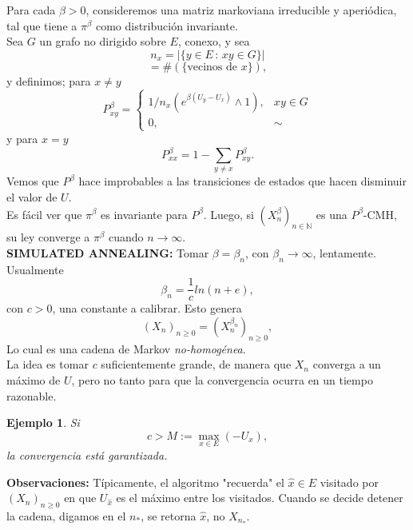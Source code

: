 \documentclass[a4paper]{article}
\newtheorem{ejemplo}{Ejemplo}
\numberwithin{equation}{subsection}
\numberwithin{definicion}{subsection}
\def\N{\mathbb N}
\begin{document}
Para cada $\beta >0$, consideremos una matriz markoviana irreducible y aperiódica, tal que tiene a $\pi^\beta$ como distribución invariante. \\ Sea $G$ un grafo no dirigido sobre $E$, conexo, y sea
\[n_x = |\{y \in E\,:\,xy \in G\}|\]
\[= \#\left(\{\text{vecinos de }x\}\right),\]
y definimos; para $x\neq y$
\[P_{xy}^\beta = \begin{cases}
1/n_x\left(e^{\beta(U_y-U_x)}\wedge 1\right), & xy\in G\\
0, & \sim
\end{cases}\]
y para $x=y$
\[P_{xx}^\beta = 1-\sum_{y \neq x}P_{xy}^\beta. \]
Vemos que $P^\beta$ hace improbables a las transiciones de estados que hacen disminuir el valor de $U$.\\ Es fácil ver que $\pi^\beta$ es invariante para $P^\beta$. Luego, si $(X_n^\beta)_{n\in \N}$ es una $P^\beta$-CMH, su ley converge a $\pi^\beta$ cuando $n\rightarrow \infty$. \\ \newline
\textbf{SIMULATED ANNEALING: }Tomar $\beta = \beta_n$, con $\beta_n \rightarrow \infty$, lentamente.\\ \newline
Usualmente
\[\beta_n = \frac{1}{c}ln(n+e),\]
con $c>0$, una constante a calibrar. Esto genera
\[(X_n)_{n\geq0} = (X_n^{\beta_n})_{n\geq 0},\]
Lo cual es una cadena de Markov \textit{no-homogénea}.\\La idea es tomar $c$ suficientemente grande, de manera que $X_n$ converga a un máximo de $U$, pero no tanto para que la convergencia ocurra en un tiempo razonable.
\begin{ejemplo}
Si 
\[c > M:=\max_{x \in E}\left(-U_x\right),\]
la convergencia está garantizada.
\end{ejemplo}

\textbf{Observaciones:} Típicamente, el algoritmo "recuerda" el $\hat{x}\in E$ visitado por $(X_n)_{n\geq 0}$ en que $U_{\hat{x}}$ es el máximo entre los visitados. Cuando se decide detener la cadena, digamos en el $n_{*}$, se retorna $\hat{x}$, no $X_{n_{*}}$.
\end{document}
